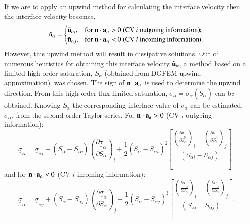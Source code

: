 \documentclass[preprint,authoryear,12pt]{elsarticle}
\newcommand{\frc}{\displaystyle\frac}
\begin{document}
If we are to apply an upwind method for calculating the interface velocity then the interface velocity becomes, %
\begin{displaymath}
{\tilde{\bf u}}_{\alpha} =
\begin{cases}
\tilde{\bf u}_{\alpha i}, & \text{for } {\bf n}\cdot{\bf a}_{\alpha}>0 \text{ (CV {\it i} outgoing information);} \\
\tilde{\bf u}_{\alpha j}, & \text{for } {\bf n}\cdot{\bf a}_{\alpha}<0 \text{ (CV {\it i} incoming information).} 
\end{cases}
\end{displaymath}
However, this upwind method will result in dissipative solutions. Out of numerous heuristics for obtaining this interface velocity ${\tilde{\bf u}}_\alpha$, a method based on a limited high-order saturation, $\tilde S_\alpha$ (obtained from DGFEM upwind approximation), was chosen. The sign of ${\bf n}\cdot {\bf a}_\alpha$ is used to determine the upwind direction. From this high-order flux limited saturation, $\tilde{\sigma}_{\alpha} = \sigma_{\alpha}\left(\tilde{S}_{\alpha}\right)$ can be obtained. Knowing $\tilde S_\alpha$ the corresponding interface value of $\sigma_\alpha$ can be estimated, $\tilde\sigma_\alpha$, from the second-order Taylor series. For ${\bf n}\cdot {\bf a}_\alpha>0$ (CV $i$ outgoing information):
\begin{equation}
  \underline{\underline{\tilde{\sigma}}}_{\alpha} = \underline{\underline{\sigma}}_{\alpha i} + \left(\tilde{S}_{\alpha}-S_{\alpha i}\right) \left(\frc{\partial \underline{\underline{\sigma}}_{\alpha}}{\partial S_{\alpha}}\right)_{i} + \frc{1}{2}\left(\tilde{S}_{\alpha}-S_{\alpha i}\right)^{2} \left[ \frc{ \left(\frc{\partial \underline{\underline{\sigma}}_{\alpha}}{\partial S_{\alpha}}\right)_{i} - \left(\frc{\partial \underline{\underline{\sigma}}_{\alpha}}{\partial S_{\alpha}}\right)_{j} } { \left(S_{\alpha i}-S_{\alpha j}\right) } \right],
  \label{sigma-out}
\end{equation}
and for ${\bf n}\cdot {\bf a}_\alpha<0$ (CV $i$ incoming information):
\begin{equation}
  \underline{\underline{\tilde{\sigma}}}_{\alpha} = \underline{\underline{\sigma}}_{\alpha j} + \left(\tilde{S}_{\alpha}-S_{\alpha j}\right) \left(\frc{\partial \underline{\underline{\sigma}}_{\alpha}}{\partial S_{\alpha}}\right)_{j} + \frc{1}{2}\left(\tilde{S}_{\alpha}-S_{\alpha j}\right)^{2} \left[ \frc{ \left(\frc{\partial \underline{\underline{\sigma}}_{\alpha}}{\partial S_{\alpha}}\right)_{i} - \left(\frc{\partial \underline{\underline{\sigma}}_{\alpha}}{\partial S_{\alpha}}\right)_{j} } { \left(S_{\alpha i}-S_{\alpha j}\right) } \right].
  \label{sigma-in}
\end{equation}
\end{document}
